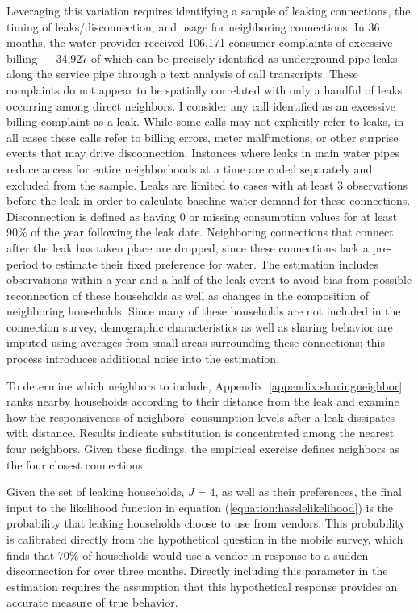 \documentclass[12pt]{article}
\begin{document}
Leveraging this variation requires identifying a sample of leaking connections, the timing of leaks/disconnection, and usage for neighboring connections.  In 36 months, the water provider received 106,171 consumer complaints of excessive billing --- 34,927 of which can be precisely identified as underground pipe leaks along the service pipe through a text analysis of call transcripts.  These complaints do not appear to be spatially correlated with only a handful of leaks occurring among direct neighbors.  I consider any call identified as an excessive billing complaint as a leak.  While some calls may not explicitly refer to leaks, in all cases these calls refer to billing errors, meter malfunctions, or other surprise events that may drive disconnection.  Instances where leaks in main water pipes reduce access for entire neighborhoods at a time are coded separately and excluded from the sample.  Leaks are limited to cases with at least 3 observations before the leak in order to calculate baseline water demand for these connections.  Disconnection is defined as having 0 or missing consumption values for at least 90\% of the year following the leak date.  Neighboring connections that connect after the leak has taken place are dropped, since these connections lack a pre-period to estimate their fixed preference for water.  The estimation includes observations within a year and a half of the leak event to avoid bias from possible reconnection of these households as well as changes in the composition of neighboring households.  Since many of these households are not included in the connection survey, demographic characteristics as well as sharing behavior are imputed using averages from small areas surrounding these connections; this process introduces additional noise into the estimation.

To determine which neighbors to include, Appendix~\ref{appendix:sharingneighbor} ranks nearby households according to their distance from the leak and examine how the responsiveness of neighbors' consumption levels after a leak dissipates with distance.  Results indicate substitution is concentrated among the nearest four neighbors.  Given these findings, the empirical exercise defines neighbors as the four closest connections.  


Given the set of leaking households, $J=4$, as well as their preferences, the final input to the likelihood function in equation (\ref{equation:hasslelikelihood}) is the probability that leaking households choose to use from vendors.  This probability is calibrated directly from the hypothetical question in the mobile survey, which finds that 70\% of households would use a vendor in response to a sudden disconnection for over three months.  Directly including this parameter in the estimation requires the assumption that this hypothetical response provides an accurate measure of true behavior.
\end{document}
